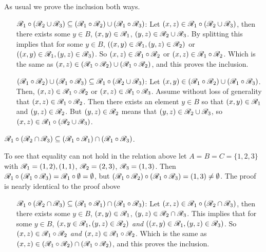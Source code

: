 \documentclass[a4paper, english, 12pt]{article} %
\begin{document}
\begin{answer}
  As usual we prove the inclusion both ways.
  \begin{enumerate}[align=left]
     \item[  $\mathscr{R}_1 \circ (\mathscr{R}_2 \cup \mathscr{R}_3) \subseteq (\mathscr{R}_1 \circ \mathscr{R}_2) \cup (\mathscr{R}_1
  \circ \mathscr{R}_3)$:] Let $(x,z) \in \mathscr{R}_1 \circ (\mathscr{R}_2 \cup \mathscr{R}_3)$, then there
      exists some $y \in B$, $(x,y) \in \mathscr{R}_1$, $(y,z) \in \mathscr{R}_2 \cup \mathscr{R}_3$. By
      splitting this implies that for some $y \in B$, $((x,y) \in \mathscr{R}_1,
      (y,z)\in \mathscr{R}_2)$ or $((x,y)\in \mathscr{R}_1, (y,z)\in\mathscr{R}_3)$. So $(x,z) \in \mathscr{R}_1
      \circ \mathscr{R}_2$ or $(x,z)\in\mathscr{R}_1 \circ \mathscr{R}_2$. Which is the same as $(x,z)
      \in (\mathscr{R}_1 \circ \mathscr{R}_2) \cup (\mathscr{R}_1 \circ \mathscr{R}_2)$, and this proves the inclusion.
     \item[  $(\mathscr{R}_1 \circ \mathscr{R}_2) \cup (\mathscr{R}_1
  \circ \mathscr{R}_3) \subseteq \mathscr{R}_1 \circ (\mathscr{R}_2 \cup \mathscr{R}_3) $:] Let $(x,y) \in (\mathscr{R}_1
      \circ \mathscr{R}_2) \cup (\mathscr{R}_1 \circ \mathscr{R}_3)$. Then, $(x,z) \in \mathscr{R}_1 \circ \mathscr{R}_2
      $ or $(x,z) \in \mathscr{R}_1 \circ \mathscr{R}_3$. Assume without loss of generality that
      $(x,z) \in \mathscr{R}_1 \circ \mathscr{R}_2$. Then there exists an element $y \in B$ so
      that $(x,y) \in \mathscr{R}_1$ and $(y,z) \in \mathscr{R}_2$. But $(y,z) \in \mathscr{R}_2$ means
      that $(y,z) \in \mathscr{R}_2 \cup \mathscr{R}_3$, so $(x,z) \in \mathscr{R}_1 \circ (\mathscr{R}_2 \cup
      \mathscr{R}_3)$.   
  \end{enumerate}
\end{answer}
    
\begin{subproblem}
  $\mathscr{R}_1 \circ (\mathscr{R}_2 \cap \mathscr{R}_3) \subseteq (\mathscr{R}_1 \circ \mathscr{R}_1) \cap
  (\mathscr{R}_1 \circ \mathscr{R}_3)$.
\end{subproblem}

\begin{answer}
  To see that equality can not hold in the relation above let $A = B = C =
  \{1,2,3\}$ with $\mathscr{R}_1 = {(1,2), (1,1)}$, $\mathscr{R}_2 = {(2,3)}$, $\mathscr{R}_3 =
  {(1,3)}$. Then $\mathscr{R}_1 \circ (\mathscr{R}_1 \circ \mathscr{R}_3) = \mathscr{R}_1 \circ \emptyset =
  \emptyset$, but $(\mathscr{R}_1 \circ \mathscr{R}_2) \circ (\mathscr{R}_1 \circ \mathscr{R}_3) = {(1,3)} \neq
  \emptyset$.
  The proof is nearly identical to the proof above
  \begin{enumerate}[align=left]
     \item[$ \mathscr{R}_1 \circ (\mathscr{R}_2 \cap \mathscr{R}_3) \subseteq (\mathscr{R}_1 \circ \mathscr{R}_1) \cap
  (\mathscr{R}_1 \circ \mathscr{R}_3) $:] Let $(x,z) \in \mathscr{R}_1 \circ (\mathscr{R}_2 \cap \mathscr{R}_3)$, then
      there exists some $y \in B$, $(x,y) \in \mathscr{R}_1$, $(y,z) \in \mathscr{R}_2 \cap
      \mathscr{R}_3$. This implies that for some $y \in B$, $(x,y \in \mathscr{R}_1, (y,z) \in
      \mathscr{R}_2)$ \emph{and} $((x,y) \in \mathscr{R}_1, (y,z) \in \mathscr{R}_3) $. So $(x,z) \in
      \mathscr{R}_1 \circ \mathscr{R}_2$ \emph{and} $(x,z) \in \mathscr{R}_1 \circ \mathscr{R}_2$. Which is the
      same as $(x,z) \in (\mathscr{R}_1 \circ \mathscr{R}_2) \cap (\mathscr{R}_1 \circ \mathscr{R}_2)$, and this
      proves the inclusion.
  \end{enumerate}
\end{answer}
\end{document}
